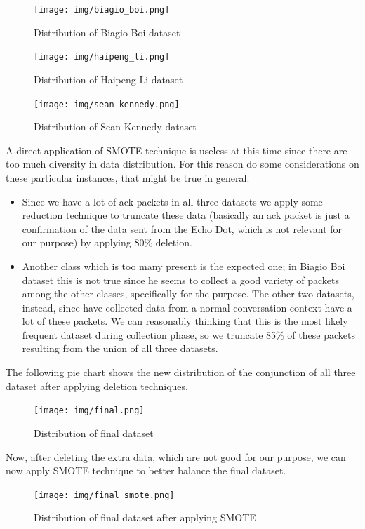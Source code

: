 \documentclass[sigconf]{acmart}
\begin{document}
\begin{figure}[h!]
        \texttt{[image: img/biagio\_boi.png]}
        \caption{Distribution of Biagio Boi dataset}
        \label{fig:parser}
    \end{figure}
    
\begin{figure}[h!]
        \texttt{[image: img/haipeng\_li.png]}
        \caption{Distribution of Haipeng Li dataset}
        \label{fig:parser}
    \end{figure}
    
\begin{figure}[h!]
        \texttt{[image: img/sean\_kennedy.png]}
        \caption{Distribution of Sean Kennedy dataset}
        \label{fig:sean_kennedy}
    \end{figure}
A direct application of SMOTE technique is useless at this time since there are too much diversity in data distribution. For this reason do some considerations on these particular instances, that might be true in general:
\begin{itemize}
\item Since we have a lot of ack packets in all three datasets we apply some reduction technique to truncate these data (basically an ack packet is just a confirmation of the data sent from the Echo Dot, which is not relevant for our purpose) by applying 80\% deletion.
\item Another class which is too many present is the expected one; in Biagio Boi dataset this is not true since he seems to collect a good variety of packets among the other classes, specifically for the purpose. The other two datasets, instead, since have collected data from a normal conversation context have a lot of these packets. We can reasonably thinking that this is the most likely frequent dataset during collection phase, so we truncate 85\% of these packets resulting from the union of all three datasets.
\end{itemize}
The following pie chart shows the new distribution of the conjunction of all three dataset after applying deletion techniques.

\begin{figure}[h!]
        \texttt{[image: img/final.png]}
        \caption{Distribution of final dataset}
        \label{fig:final}
    \end{figure}
    
Now, after deleting the extra data, which are not good for our purpose, we can now apply SMOTE technique to better balance the final dataset.
\begin{figure}[h!]
        \texttt{[image: img/final\_smote.png]}
        \caption{Distribution of final dataset after applying SMOTE}
        \label{fig:final_smote}
    \end{figure}
\end{document}
